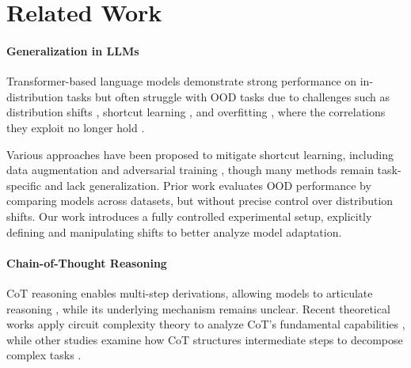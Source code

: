 \section{Related Work}
\paragraph{Generalization in LLMs}
Transformer-based language models \cite{vaswani2017attention} demonstrate strong performance on in-distribution tasks \cite{minaee2024largelanguagemodelssurvey,naveed2024comprehensiveoverviewlargelanguage,Xu_2024} but often struggle with OOD tasks due to challenges such as distribution shifts \cite{anil2022exploringlengthgeneralizationlarge,zhang2022delving}, shortcut learning \cite{liu2022transformers,geirhos2020shortcut}, and overfitting \cite{li2023transformers}, where the correlations they exploit no longer hold \cite{qian2022limitationslanguagemodelsarithmetic,nogueira2021investigatinglimitationstransformerssimple}.

Various approaches have been proposed to mitigate shortcut learning, including data augmentation \cite{hendrycks2020pretrainedtransformersimproveoutofdistribution,zhang2023unveilingtransformerslegosynthetic} and adversarial training \cite{jiang2019avoiding,taori2020when}, though many methods remain task-specific and lack generalization. Prior work \cite{chen2024alphamathzeroprocesssupervision} evaluates OOD performance by comparing models across datasets, but without precise control over distribution shifts. Our work introduces a fully controlled experimental setup, explicitly defining and manipulating shifts to better analyze model adaptation.
\vspace{-\baselineskip}
\paragraph{Chain-of-Thought Reasoning}
CoT reasoning enables multi-step derivations, allowing models to articulate reasoning \cite{wei2022chain,kojima2022large,zhu2024deductive,fu2022complexity,kim2024transformers}, while its underlying mechanism remains unclear. Recent theoretical works apply circuit complexity theory to analyze CoT’s fundamental capabilities \cite{li2024chainthoughtempowerstransformers,abbe2024fartransformersreasonglobality,feng2023revealingmysterychainthought}, while other studies examine how CoT structures intermediate steps to decompose complex tasks \cite{ton2024understandingchainofthoughtllmsinformation,kudo2024thinktotalktalktothinkllmscome,yu2025llmsreallythinkstepbystep,anonymous2025chainofthought}. 

